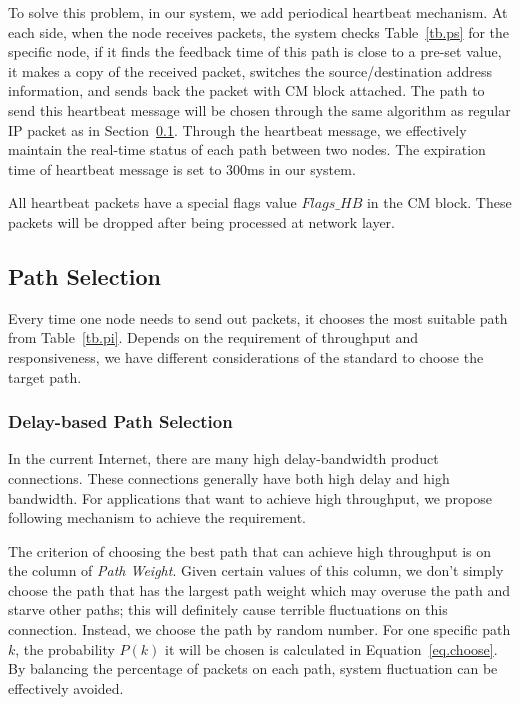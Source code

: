 To solve this problem, in our system, we add periodical heartbeat mechanism. At each side, when the node receives packets, the system checks Table~\ref{tb.ps} for the specific node, if it finds the feedback time of this path is close to a pre-set value, it makes a copy of the received packet, switches the source/destination address information, and sends back the packet with CM block attached. The path to send this heartbeat message will be chosen through the same algorithm as regular IP packet as in Section~\ref{sec:selection}. Through the heartbeat message, we effectively maintain the real-time status of each path between two nodes. The expiration time of heartbeat message is set to $300$ms in our system.

All heartbeat packets have a special flags value $Flags\_HB$ in the CM block. These packets will be dropped after being processed at network layer.

\subsection{Path Selection}
\label{sec:selection}

Every time one node needs to send out packets, it chooses the most suitable path from Table~\ref{tb.pi}. Depends on the requirement of throughput and responsiveness, we have different considerations of the standard to choose the target path.

\subsubsection{Delay-based Path Selection}
\label{sec:delay}
In the current Internet, there are many high delay-bandwidth product connections. These connections generally have both high delay and high bandwidth. For applications that want to achieve high throughput, we propose following mechanism to achieve the requirement. 

The criterion of choosing the best path that can achieve high throughput is on the column of \emph{Path Weight}. Given certain values of this column, we don't simply choose the path that has the largest path weight which may overuse the path and starve other paths; this will definitely cause terrible fluctuations on this connection. Instead, we choose the path by random number. For one specific path $k$, the probability $P(k)$ it will be chosen is calculated in Equation~\ref{eq.choose}. By balancing the percentage of packets on each path, system fluctuation can be effectively avoided.

